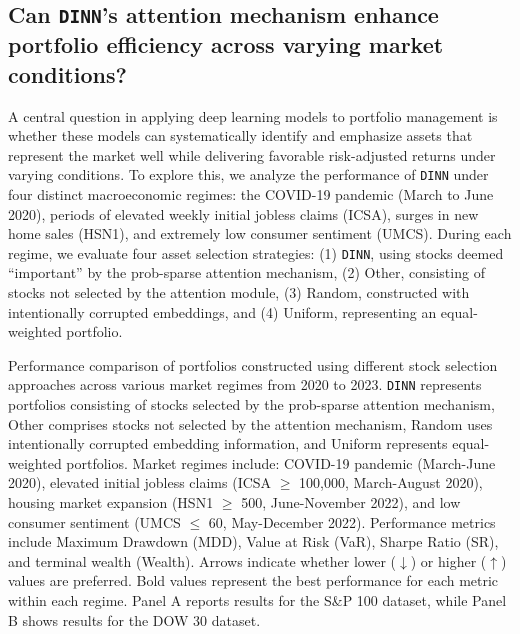 \subsection{Can \texttt{DINN}'s attention mechanism enhance portfolio efficiency across varying market conditions?}

A central question in applying deep learning models to portfolio management is whether these models can systematically identify and emphasize assets that represent the market well while delivering favorable risk-adjusted returns under varying conditions. To explore this, we analyze the performance of \texttt{DINN} under four distinct macroeconomic regimes: the COVID-19 pandemic (March to June 2020), periods of elevated weekly initial jobless claims (ICSA), surges in new home sales (HSN1), and extremely low consumer sentiment (UMCS). During each regime, we evaluate four asset selection strategies: (1) \texttt{DINN}, using stocks deemed “important” by the prob-sparse attention mechanism, (2) Other, consisting of stocks not selected by the attention module, (3) Random, constructed with intentionally corrupted embeddings, and (4) Uniform, representing an equal-weighted portfolio.

\begin{table}[!htbp]
\centering

\captionsetup{font=footnotesize}
\caption{Performance comparison of portfolios constructed using different stock selection approaches across various market regimes from 2020 to 2023. \texttt{DINN} represents portfolios consisting of stocks selected by the prob-sparse attention mechanism, Other comprises stocks not selected by the attention mechanism, Random uses intentionally corrupted embedding information, and Uniform represents equal-weighted portfolios. Market regimes include: COVID-19 pandemic (March-June 2020), elevated initial jobless claims (ICSA $\ge$ 100,000, March-August 2020), housing market expansion (HSN1 $\ge$ 500, June-November 2022), and low consumer sentiment (UMCS $\le$ 60, May-December 2022). Performance metrics include Maximum Drawdown (MDD), Value at Risk (VaR), Sharpe Ratio (SR), and terminal wealth (Wealth). Arrows indicate whether lower ($\downarrow$) or higher ($\uparrow$) values are preferred. Bold values represent the best performance for each metric within each regime. Panel A reports results for the S\&P 100 dataset, while Panel B shows results for the DOW 30 dataset.}
\label{tab2:attns_result}
\vspace{-0.5cm}
\end{table}


